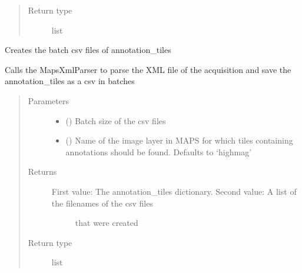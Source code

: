 \documentclass[letterpaper,10pt,english]{sphinxmanual}
\begin{document}
\begin{fulllineitems}
\begin{fulllineitems}
\begin{quote}
\begin{description}
\begin{description}
\end{description}


\item[{Return type}] \leavevmode
list

\end{description}\end{quote}

\end{fulllineitems}


\begin{fulllineitems}
\label{\detokenize{index:stitch_MAPS_annotations.Stitcher.parse_create_csv_batches}}
Creates the batch csv files of annotation\_tiles

Calls the MapsXmlParser to parse the XML file of the acquisition and save the annotation\_tiles as a csv in
batches
\begin{quote}\begin{description}
\item[{Parameters}] \leavevmode\begin{itemize}
\item {} 
 () \textendash{} Batch size of the csv files

\item {} 
 () \textendash{} Name of the image layer in MAPS for which tiles containing annotations should
be found. Defaults to ‘highmag’

\end{itemize}

\item[{Returns}] \leavevmode
\begin{description}
\item[{First value: The annotation\_tiles dictionary. Second value: A list of the filenames of the csv files}] \leavevmode
that were created

\end{description}


\item[{Return type}] \leavevmode
list


\end{description}
\end{quote}
\end{fulllineitems}
\end{fulllineitems}
\end{document}
